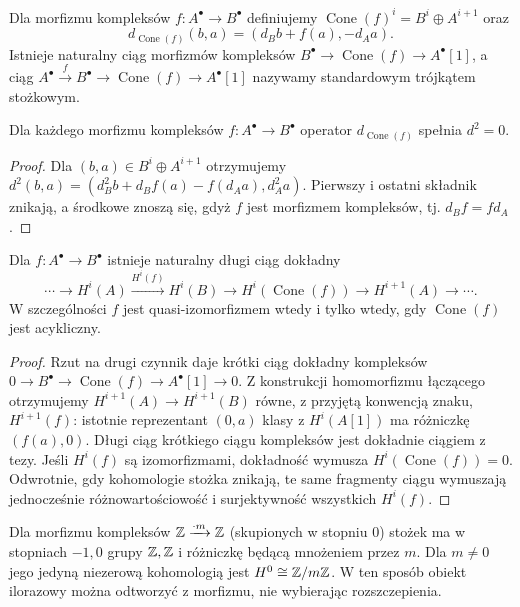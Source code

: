 \begin{definicja}
Dla morfizmu kompleksów $f:A^\bullet\to B^\bullet$
definiujemy $\operatorname{Cone}(f)^i=B^i\oplus A^{i+1}$ oraz
\[
d_{\operatorname{Cone}(f)}(b,a)=(d_Bb+f(a),-d_Aa).
\]
Istnieje naturalny ciąg morfizmów kompleksów
$B^\bullet\to\operatorname{Cone}(f)\to A^\bullet[1]$,
a ciąg $A^\bullet\xrightarrow f B^\bullet\to
\operatorname{Cone}(f)\to A^\bullet[1]$
nazywamy standardowym trójkątem stożkowym.
\end{definicja}
\begin{lemat}
\label{lem:cone-complex-xiv}
Dla każdego morfizmu kompleksów $f:A^\bullet\to B^\bullet$
operator $d_{\operatorname{Cone}(f)}$ spełnia $d^2=0$.
\end{lemat}
\begin{proof}
Dla $(b,a)\in B^i\oplus A^{i+1}$ otrzymujemy
$d^2(b,a)=(d_B^2b+d_Bf(a)-f(d_Aa),d_A^2a)$.
Pierwszy i ostatni składnik znikają, a środkowe znoszą się,
gdyż $f$ jest morfizmem kompleksów, tj. $d_Bf=fd_A$.
\end{proof}

\begin{twierdzenie}
\label{thm:cone-les-xiv}
Dla $f:A^\bullet\to B^\bullet$ istnieje naturalny długi
ciąg dokładny
\[
\cdots\to H^i(A)\xrightarrow{H^i(f)}H^i(B)
\to H^i(\operatorname{Cone}(f))\to H^{i+1}(A)\to\cdots.
\]
W szczególności $f$ jest quasi-izomorfizmem wtedy i tylko wtedy,
gdy $\operatorname{Cone}(f)$ jest acykliczny.
\end{twierdzenie}
\begin{proof}
Rzut na drugi czynnik daje krótki ciąg dokładny kompleksów
$0\to B^\bullet\to\operatorname{Cone}(f)\to A^\bullet[1]\to0$.
Z konstrukcji homomorfizmu łączącego otrzymujemy
$H^{i+1}(A)\to H^{i+1}(B)$ równe, z przyjętą konwencją
znaku, $H^{i+1}(f)$: istotnie reprezentant $(0,a)$
klasy z $H^i(A[1])$ ma różniczkę $(f(a),0)$.
Długi ciąg krótkiego ciągu kompleksów jest dokładnie
ciągiem z tezy. Jeśli $H^i(f)$ są izomorfizmami,
dokładność wymusza $H^i(\operatorname{Cone}(f))=0$.
Odwrotnie, gdy kohomologie stożka znikają, te same
fragmenty ciągu wymuszają jednocześnie różnowartościowość
i surjektywność wszystkich $H^i(f)$.
\end{proof}

\begin{przyklad}
Dla morfizmu kompleksów $\mathbb{Z}\xrightarrow{\cdot m}\mathbb{Z}$
(skupionych w stopniu $0$) stożek ma w stopniach
$-1,0$ grupy $\mathbb{Z},\mathbb{Z}$ i różniczkę będącą mnożeniem
przez $m$. Dla $m\neq0$ jego jedyną niezerową kohomologią
jest $H^0\cong\mathbb{Z}/m\mathbb{Z}$. W ten sposób obiekt ilorazowy
można odtworzyć z morfizmu, nie wybierając rozszczepienia.
\end{przyklad}

